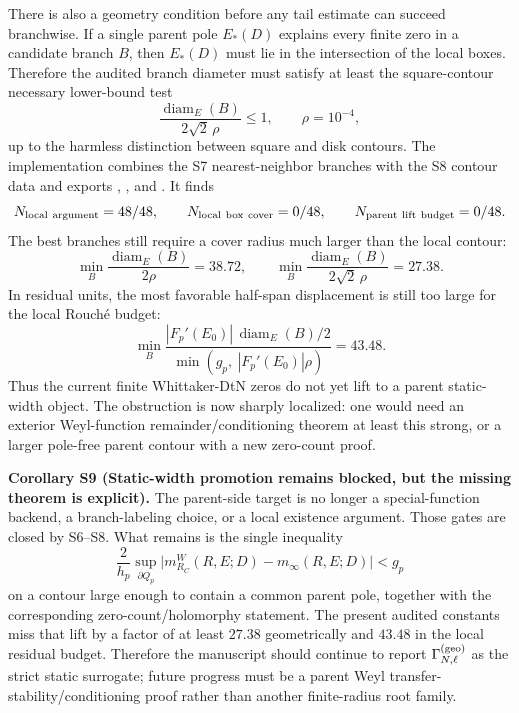 \documentclass[aps,prd,onecolumn,notitlepage,nofootinbib,superscriptaddress,11pt,floatfix]{revtex4-2}
\begin{document}
There is also a geometry condition before any tail estimate can succeed branchwise.  If a single parent pole \(E_\ast(D)\) explains every finite zero in a candidate branch \(B\), then \(E_\ast(D)\) must lie in the intersection of the local boxes.  Therefore the audited branch diameter must satisfy at least the square-contour necessary lower-bound test
\[
\frac{\operatorname{diam}_E(B)}{2\sqrt2\,\rho}\le 1,
\qquad
\rho=10^{-4},
\]
up to the harmless distinction between square and disk contours.  The implementation  combines the S7 nearest-neighbor branches with the S8 contour data and exports , , and .  It finds
\[
N_{\rm local\ argument}=48/48,\qquad
N_{\rm local\ box\ cover}=0/48,\qquad
N_{\rm parent\ lift\ budget}=0/48 .
\]
The best branches still require a cover radius much larger than the local contour:
\[
\min_B\frac{\operatorname{diam}_E(B)}{2\rho}=38.72,
\qquad
\min_B\frac{\operatorname{diam}_E(B)}{2\sqrt2\,\rho}=27.38.
\]
In residual units, the most favorable half-span displacement is still too large for the local Rouché budget:
\[
\min_B
\frac{|F_p'(E_0)|\,\operatorname{diam}_E(B)/2}
{\min(g_p,\ |F_p'(E_0)|\rho)}
=43.48 .
\]
Thus the current finite Whittaker-DtN zeros do not yet lift to a parent static-width object.  The obstruction is now sharply localized: one would need an exterior Weyl-function remainder/conditioning theorem at least this strong, or a larger pole-free parent contour with a new zero-count proof.

\medskip\noindent\textbf{Corollary S9 (Static-width promotion remains blocked, but the missing theorem is explicit).}
The parent-side target is no longer a special-function backend, a branch-labeling choice, or a local existence argument.  Those gates are closed by S6--S8.  What remains is the single inequality
\[
\frac{2}{h_p}
\sup_{\partial Q_p}
\bigl|m_{R_C}^{W}(R,E;D)-m_\infty(R,E;D)\bigr|
<
g_p
\]
on a contour large enough to contain a common parent pole, together with the corresponding zero-count/holomorphy statement.  The present audited constants miss that lift by a factor of at least \(27.38\) geometrically and \(43.48\) in the local residual budget.  Therefore the manuscript should continue to report \(\Gamma_{N,\ell}^{\rm(geo)}\) as the strict static surrogate; future progress must be a parent Weyl transfer-stability/conditioning proof rather than another finite-radius root family.
\end{document}
